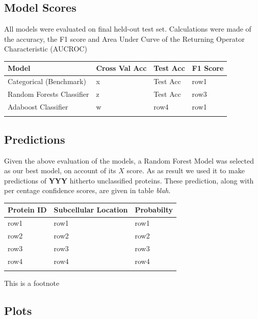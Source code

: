 \documentclass{bioinfo}
\begin{document}
\subsection{Model Scores}

All models were evaluated on final held-out test set. Calculations were made of the accuracy, the F1 score and Area Under Curve of the Returning Operator Characteristic (AUCROC)

\begin{table}[!h]
 {\begin{tabular}{@{}llll@{}}\toprule Model  & Cross Val Acc & Test Acc &F1 Score \\\midrule
Categorical (Benchmark) & x & Test Acc &row1  \\
Random Forests Classifier & z &  Test Acc &row3 \\
Adaboost Classifier & w & row4 & row1\\\botrule
\end{tabular}}{}
\end{table}


\subsection{Predictions}

Given the above evaluation of the models, a Random Forest Model was selected as our best model, on account of its $X$ score. As as result we used it to make predictions of \textbf{YYY} hitherto unclassified proteins. These prediction, along with per centage confidence scores, are given in table \textit{blah}.

\begin{table}[!h]
 {\begin{tabular}{@{}lll@{}}\toprule Protein ID  & Subcellular Location & Probabilty \\\midrule
row1 & row1 & row1 \\
row2 & row2 & row2 \\
row3 & row3 & row3 \\
row4 & row4 & row4 \\\botrule
\end{tabular}}{This is a footnote}
\end{table}


\subsection{Plots}
\end{document}
